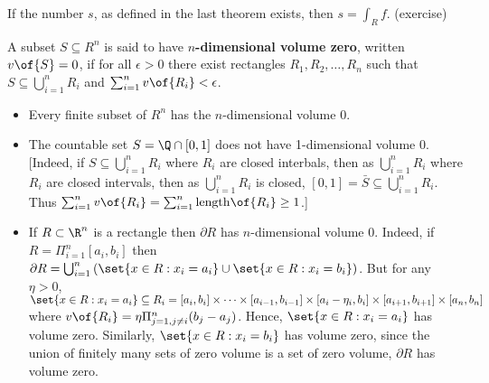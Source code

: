 \begin{remark}
    If the number $s$, as defined in the last theorem exists, then $s = \int_R f$. (exercise)
\end{remark}

\begin{definition}
    A subset $S \subseteq R^n$ is said to have \textbf{$n$-dimensional volume zero}, written $v\of{S} = 0$, if for all $\epsilon > 0$ there exist rectangles $R_1, R_2, \dots, R_n$ such that $S \subseteq \bigcup_{i = 1}^n R_i$ and $\sum_{i = 1}^n v\of{R_i} < \epsilon$.
\end{definition}

\begin{example}
    \begin{itemize}
        \item Every finite subset of $R^n$ has the $n$-dimensional volume 0.
        \item The countable set $S = \Q \cap [0,1]$ does not have 1-dimensional volume 0. [Indeed, if $S \subseteq \bigcup_{i=1}^n R_i$ where $R_i$ are closed interbals, then as $\bigcup_{i=1}^n R_i$ where $R_i$ are closed intervals, then as $\bigcup_{i=1}^n R_i$ is closed, $[0,1] = \bar{S} \subseteq \bigcup_{i=1}^n R_i$. Thus $\sum_{i=1}^n v\of{R_i} = \sum_{i=1}^n \mathrm{length}\of{R_i} \geq 1$.]
        \item If $R \subset \R^n$ is a rectangle then $\partial R$ has $n$-dimensional volume 0. Indeed, if $R = \Pi_{i=1}^n [a_i,b_i]$ then $\partial R = \bigcup_{i=1}^n \left(\set{x \in R: x_i = a_i} \cup \set{x \in R: x_i = b_i}\right)$. But for any $\eta > 0$, $\set{x \in R: x_i = a_i} \subseteq R_i = [a_i,b_i] \times \cdots \times [a_{i-1}, b_{i-1}] \times [a_i - \eta_i, b_i] \times [a_{i+1},b_{i+1}] \times [a_n, b_n]$ where $v\of{R_i} = \eta \Pi_{j=1, j\neq i}^n (b_j - a_j)$. Hence, $\set{x \in R: x_i = a_i}$ has volume zero. Similarly, $\set{x \in R: x_i = b_i}$ has volume zero, since the union of finitely many sets of zero volume is a set of zero volume, $\partial R$ has volume zero.
    \end{itemize}
\end{example}

